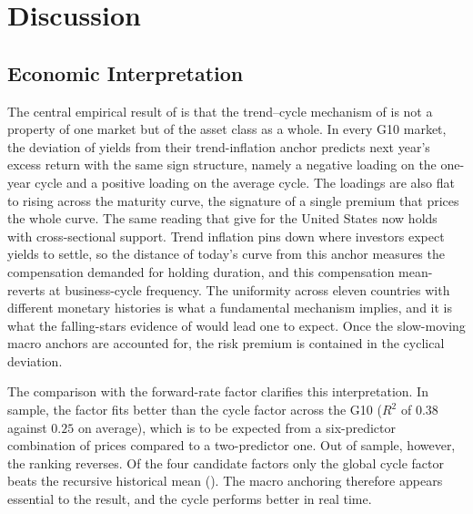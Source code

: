 \chapter{Discussion}
\label{ch:discussion}

\section{Economic Interpretation}
\label{sec:disc-econ}


The central empirical result of  is that the trend--cycle
mechanism of \citet{cieslak2015} is not a property of one market but of the
asset class as a whole. In every G10 market, the deviation of yields from
their trend-inflation anchor predicts next year's excess return with the same
sign structure, namely a negative loading on the one-year cycle and a
positive loading on the average cycle. The loadings are also flat to
rising across the maturity curve, the signature of a single
premium that prices the whole curve. The same reading that
\citet{cieslak2015} give for the United States now holds with cross-sectional
support. Trend inflation pins down where investors expect yields to settle,
so the distance of today's curve from this anchor measures the compensation
demanded for holding duration, and this compensation mean-reverts at
business-cycle frequency. The uniformity across eleven countries with
different monetary histories is what a fundamental mechanism implies, and it
is what the falling-stars evidence of \citet{bauer2020} would lead one to
expect. Once
the slow-moving macro anchors are accounted for, the risk premium is
contained in the cyclical deviation.

The comparison with the forward-rate factor clarifies this interpretation. In
sample, the \citet{cochrane2005} factor fits better than the cycle factor
across the G10 ($R^{2}$ of $0.38$ against $0.25$ on average), which is to be expected from a six-predictor combination of prices compared to a two-predictor
one. Out of sample, however, the ranking reverses. Of the four
candidate factors only the global cycle factor beats the recursive
historical mean (). The macro anchoring therefore appears essential to the result, and the cycle performs better in real time.

